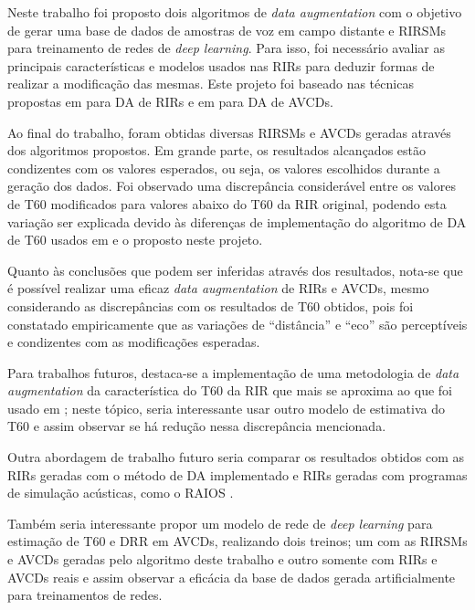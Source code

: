 Neste trabalho foi proposto dois algoritmos de \textit{data augmentation} com o objetivo de gerar uma base de dados de amostras de voz 
em campo distante e RIRSMs para treinamento de redes de \textit{deep learning}.
Para isso, foi necessário avaliar as principais características e modelos usados nas RIRs para deduzir formas de realizar
a modificação das mesmas. Este projeto foi baseado nas técnicas propostas em \cite{RIR_Data_Aug} para DA de RIRs e em \cite{Speech_Rec}
para DA de AVCDs.

Ao final do trabalho, foram obtidas diversas RIRSMs e AVCDs geradas através dos algoritmos propostos. 
Em grande parte, os resultados alcançados estão condizentes com os valores esperados, ou seja, os valores
escolhidos durante a geração dos dados. Foi observado uma discrepância considerável entre os valores de T60 modificados 
para valores abaixo do T60 da RIR original, podendo esta variação ser explicada devido às diferenças de implementação 
do algoritmo de DA de T60 usados em \cite{RIR_Data_Aug} e o proposto neste projeto.

Quanto às conclusões que podem ser inferidas através dos resultados, nota-se que é possível realizar uma eficaz
\textit{data augmentation} de RIRs e AVCDs, mesmo considerando as discrepâncias com os resultados de T60 obtidos,
pois foi constatado empiricamente que as variações de “distância” e “eco” são perceptíveis e condizentes com as modificações
esperadas.

Para trabalhos futuros, destaca-se a implementação de uma metodologia de \textit{data augmentation} da característica do T60
da RIR que mais se aproxima ao que foi usado em \cite{RIR_Data_Aug}; neste tópico, seria interessante usar outro modelo
de estimativa do T60 e assim observar se há redução nessa discrepância mencionada.

Outra abordagem de trabalho futuro seria comparar os resultados obtidos com as RIRs geradas com o método de DA implementado e RIRs 
geradas com programas de simulação acústicas, como o RAIOS \cite{RAIOS}.

Também seria interessante propor um modelo de rede de \textit{deep learning} para estimação de T60 e DRR em AVCDs,
realizando dois treinos; um com as RIRSMs e AVCDs geradas pelo algoritmo deste trabalho e outro somente com RIRs e AVCDs reais e 
assim observar a eficácia da base de dados gerada artificialmente para treinamentos de redes.







